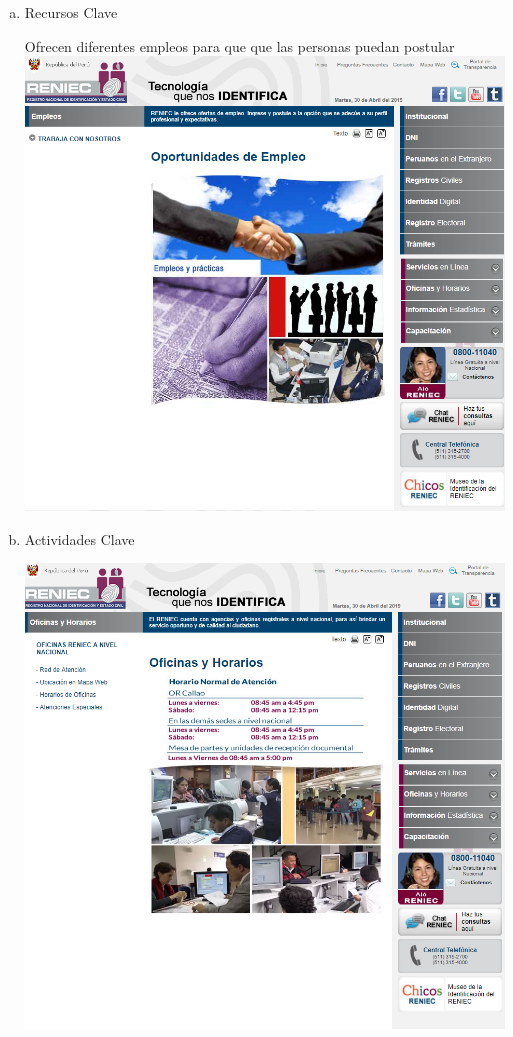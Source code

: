 \begin{enumerate}[1.]
\begin{enumerate}[a)]
\begin{center}
                    \end{center}
\item Recursos Clave \\
 \begin{center}
Ofrecen diferentes empleos para que que las personas puedan postular
                    \includegraphics[scale=0.30]{./Imagenes/f.png}
                    \end{center}
\item Actividades Clave \\
 \begin{center}

                    \includegraphics[scale=0.30]{./Imagenes/g.png}
                    \end{center}
\end{enumerate}	
		

\end{enumerate}
